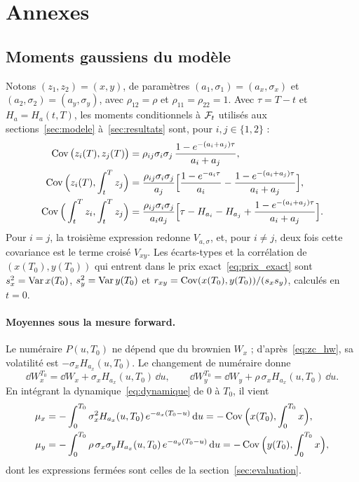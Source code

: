 \section*{Annexes}
\renewcommand{\thesubsection}{\Alph{subsection}}
\setcounter{subsection}{0}
\renewcommand{\theequation}{\Alph{subsection}.\arabic{equation}}

\subsection{Moments gaussiens du modèle}
\label{ann:moments}
\setcounter{equation}{0}

Notons $(z_1, z_2) = (x, y)$, de paramètres $(a_1, \sigma_1) = (a_x, \sigma_x)$ et $(a_2, \sigma_2) = (a_y, \sigma_y)$,
avec $\rho_{12} = \rho$ et $\rho_{11} = \rho_{22} = 1$. Avec $\tau = T - t$ et $H_a = H_a(t,T)$, les moments
conditionnels à $\mathcal{F}_t$ utilisés aux sections~\ref{sec:modele} à~\ref{sec:resultats} sont, pour $i, j \in \{1, 2\}$ :
\begin{align}
\operatorname{Cov}\big(z_i(T), z_j(T)\big) &= \rho_{ij}\sigma_i\sigma_j\,\frac{1-e^{-(a_i+a_j)\tau}}{a_i+a_j}, \\
\operatorname{Cov}\Big(z_i(T), \int_t^T z_j\Big) &= \frac{\rho_{ij}\sigma_i\sigma_j}{a_j}\Big[\frac{1-e^{-a_i\tau}}{a_i} - \frac{1-e^{-(a_i+a_j)\tau}}{a_i+a_j}\Big], \\
\operatorname{Cov}\Big(\int_t^T z_i, \int_t^T z_j\Big) &= \frac{\rho_{ij}\sigma_i\sigma_j}{a_ia_j}\Big[\tau - H_{a_i} - H_{a_j} + \frac{1-e^{-(a_i+a_j)\tau}}{a_i+a_j}\Big].
\end{align}
Pour $i = j$, la troisième expression redonne $V_{a,\sigma}$, et, pour $i \neq j$, deux fois cette covariance est le
terme croisé $V_{xy}$. Les écarts-types et la corrélation de $(x(T_0), y(T_0))$ qui entrent dans le prix
exact~\eqref{eq:prix_exact} sont $s_x^2 = \operatorname{Var} x(T_0)$, $s_y^2 = \operatorname{Var} y(T_0)$ et
$r_{xy} = \operatorname{Cov}(x(T_0), y(T_0))/(s_xs_y)$, calculés en $t = 0$.

\paragraph{Moyennes sous la mesure forward.} Le numéraire $P(u,T_0)$ ne dépend que du brownien $W_x$ ;
d'après~\eqref{eq:zc_hw}, sa volatilité est $-\sigma_x H_{a_x}(u,T_0)$. Le changement de numéraire donne
\begin{equation}
\dd W_x^{T_0} = \dd W_x + \sigma_x H_{a_x}(u,T_0)\,\dd u,\qquad
\dd W_y^{T_0} = \dd W_y + \rho\,\sigma_x H_{a_x}(u,T_0)\,\dd u.
\end{equation}
En intégrant la dynamique~\eqref{eq:dynamique} de $0$ à $T_0$, il vient
\begin{equation}
\begin{split}
\mu_x &= -\int_0^{T_0}\sigma_x^2 H_{a_x}(u,T_0)\,e^{-a_x(T_0-u)}\,\mathrm{d} u = -\operatorname{Cov}\Big(x(T_0),\int_0^{T_0}x\Big),\\
\mu_y &= -\int_0^{T_0}\rho\,\sigma_x\sigma_y H_{a_x}(u,T_0)\,e^{-a_y(T_0-u)}\,\mathrm{d} u = -\operatorname{Cov}\Big(y(T_0),\int_0^{T_0}x\Big),
\end{split}
\end{equation}
dont les expressions fermées sont celles de la section~\ref{sec:evaluation}.

